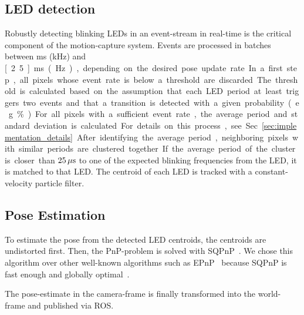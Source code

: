 \subsection{LED detection}
Robustly detecting blinking LEDs in an event-stream in real-time is the critical component of the motion-capture system. Events are processed in batches between \unit[1]{ms} (\unit[1]{kHz}) and \unit[2.5]{ms} (\unit[400]{Hz}), depending on the desired pose update rate. In a first step, all pixels whose event rate is below a threshold are discarded. The threshold is calculated based on the assumption that each LED period at least triggers two events and that a transition is detected with a given probability (e.g. \unit[80]{\%}).

For all pixels with a sufficient event rate, the average period and standard deviation is calculated. For details on this process, see Sec.~\ref{sec:implementation_details}. After identifying the average period, neighboring pixels with similar periods are clustered together. If the average period of the cluster is closer than $\unit[25]{\mu s}$ to one of the expected blinking frequencies from the LED, it is matched to that LED. The centroid of each LED is tracked with a constant-velocity particle filter.

\subsection{Pose Estimation}
To estimate the pose from the detected LED centroids, the centroids are undistorted first. Then, the PnP-problem is solved with SQPnP~\cite{terzakis2020sqpnp}. We chose this algorithm over other well-known algorithms such as EPnP~\cite{lepetit2009epnp} because SQPnP is fast enough and globally optimal~\cite{terzakis2020sqpnp}. 

The pose-estimate in the camera-frame is finally transformed into the world-frame and published via ROS. 